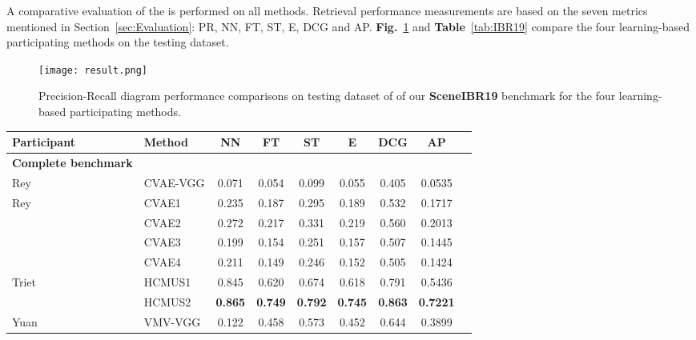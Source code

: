 \documentclass[../main.tex]{subfiles}
\begin{document}
A comparative evaluation of the is performed on all methods. Retrieval performance measurements are based on the seven metrics mentioned in Section~\ref{sec:Evaluation}: PR, NN, FT, ST, E, DCG and AP. \textbf{Fig.}~\ref{Results} and \textbf{Table}~\ref{tab:IBR19} compare the four learning-based participating methods on the testing dataset.

\begin{figure}[!htp]
	\centering
	{
		\texttt{[image: result.png]}
	}
	\caption{Precision-Recall diagram performance comparisons on testing dataset of of our \textbf{SceneIBR19} benchmark for the four learning-based participating methods.}
	\label{Results}
\end{figure}

\begin{table*}[htb]
	\centering
	\caption{Performance metrics comparison on the SHREC'19 SceneIBR Track Benchmark.}
	\label{tab:IBR19}
	\begin{tabular}{llccccccc}
		\hline		
		\normalsize {\textbf{Participant}}	&\normalsize {\textbf{Method}} &\normalsize {\textbf{NN}}  &\normalsize {\textbf{FT}} &\normalsize {\textbf{ST}} &\normalsize {\textbf{E}} &\normalsize {\textbf{DCG}} &\normalsize {\textbf{AP}}\\
		\hline
		\textbf{\normalsize{Complete benchmark}}\\
		\hline
		Rey &CVAE-VGG &0.071    &0.054   &0.099   &0.055   &0.405 &0.0535\\
		\hline
		\multirow{4}{*}{Rey}  &CVAE1  &0.235    &0.187   &0.295   &0.189   &0.532 &0.1717\\
		\cline{2-8}
		&CVAE2 &0.272    &0.217   &0.331   &0.219   &0.560  &0.2013\\
		\cline{2-8}
		&CVAE3 &0.199    &0.154   &0.251   &0.157   &0.507 &0.1445\\
		\cline{2-8}
		&CVAE4 &0.211    &0.149   &0.246   &0.152   &0.505  &0.1424\\
		\hline
		\multirow{2}{*}{Triet} 
		&HCMUS1 &0.845    &0.620   &0.674   &0.618   &0.791  &  0.5436\\	
		\cline{2-8}
		&HCMUS2 &\textbf{0.865}    &\textbf{0.749}   &\textbf{0.792}   &\textbf{0.745}   &\textbf{0.863} &\textbf{0.7221}\\	
		\hline  		 									
		Yuan &VMV-VGG &0.122	 &0.458	 &0.573	 &0.452	 &0.644 &0.3899\\			
		\hline		
	\end{tabular}
\end{table*}
\end{document}
